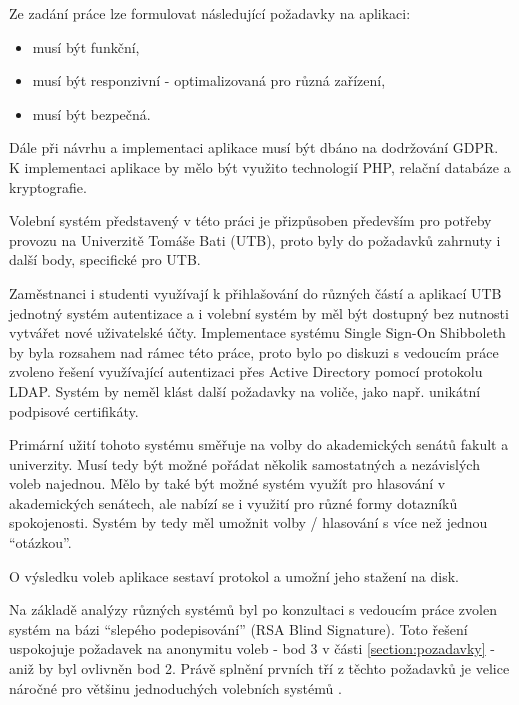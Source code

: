 

Ze zadání práce lze formulovat následující požadavky na aplikaci:

\begin{itemize}
	\item musí být funkční,
	\item musí být responzivní - optimalizovaná pro různá zařízení,
	\item musí být bezpečná.
\end{itemize}

Dále při návrhu a implementaci aplikace musí být dbáno na dodržování GDPR. K implementaci aplikace by mělo být využito technologií PHP, relační databáze a kryptografie.

Volební systém představený v této práci je přizpůsoben především pro potřeby provozu na Univerzitě Tomáše Bati (UTB), proto byly do požadavků zahrnuty i další body, specifické pro UTB. 

Zaměstnanci i studenti využívají k přihlašování do různých částí a aplikací UTB jednotný systém autentizace a i volební systém by měl být dostupný bez nutnosti vytvářet nové uživatelské účty. Implementace systému Single Sign-On Shibboleth by byla rozsahem nad rámec této práce, proto bylo po diskuzi s vedoucím práce zvoleno řešení využívající autentizaci přes Active Directory pomocí protokolu LDAP. Systém by neměl klást další požadavky na voliče, jako např. unikátní podpisové certifikáty.

Primární užití tohoto systému směřuje na volby do akademických senátů fakult a univerzity. Musí tedy být možné pořádat několik samostatných a nezávislých voleb najednou. Mělo by také být možné systém využít pro hlasování v akademických senátech, ale nabízí se i využití pro různé formy dotazníků spokojenosti. Systém by tedy měl umožnit volby / hlasování s více než jednou ``otázkou''.

O výsledku voleb aplikace sestaví protokol a umožní jeho stažení na disk.

Na základě analýzy různých systémů byl po konzultaci s vedoucím práce zvolen systém na bázi ``slepého podepisování'' (RSA Blind Signature)\cite{chaum}. Toto řešení uspokojuje požadavek na anonymitu voleb - bod 3 v části \ref{section:pozadavky} - aniž by byl ovlivněn bod 2. Právě splnění prvních tří z těchto požadavků je velice náročné pro většinu jednoduchých volebních systémů \cite{Schneier1996}.

